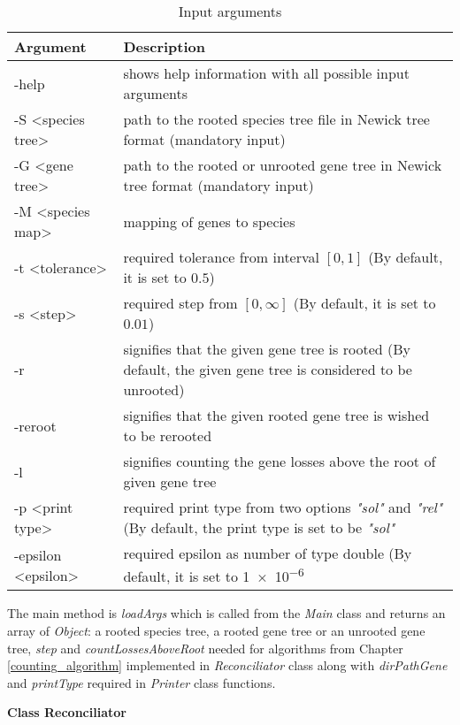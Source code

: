 \begin{table}[ht!]
\caption{Input arguments}
\centering
  \begin{tabular}{| m{} | m{} |}
  \hline
    \textbf{Argument}  & \textbf{Description}\\
    \hline
    -help & shows help information with all possible input arguments \\
    \hline
    -S <species tree> & path to the rooted species tree file in Newick tree format (mandatory input)\\
    \hline
    -G <gene tree> & path to the rooted or unrooted gene tree in Newick tree format (mandatory input)\\
    \hline
    -M <species map> & mapping of genes to species\\
    \hline
    -t <tolerance> & required tolerance from interval $[ 0, 1 ]$ (By default, it is set to $0.5$) \\
    \hline
    -s <step> & required step from $[0, \infty]$ (By default, it is set to $0.01$)\\
    \hline
    -r & signifies that the given gene tree is rooted (By default, the given gene tree is considered to be unrooted)\\
    \hline
    -reroot & signifies that the given rooted gene tree is wished to be rerooted\\
    \hline
    -l & signifies counting the gene losses above the root of given gene tree\\
    \hline
    -p <print type> & required print type from two options \emph{"sol"} and \emph{"rel"} (By default, the print type is set to be \emph{"sol"}\\
    \hline
    -epsilon <epsilon> & required epsilon as number of type double (By default, it is set to \num{1e-6}\\
    \hline
  \end{tabular}
  \label{arguments}
\end{table}

The main method is \emph{loadArgs} which is called from the \emph{Main} class and returns an array of \emph{Object}: a rooted species tree, a rooted gene tree or an unrooted gene tree, \emph{step} and \emph{countLossesAboveRoot} needed for algorithms from Chapter \ref{counting_algorithm} implemented in \emph{Reconciliator} class along with \emph{dirPathGene} and \emph{printType} required in \emph{Printer} class functions.

\noindent \textbf{Class Reconciliator}

